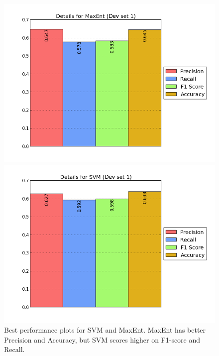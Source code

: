 \begin{figure}[!htb]
	\centering
	\begin{minipage}{.45\linewidth}
		\includegraphics[width=\linewidth]{../img/plots/analysis/maxent_stats_best.png}
	\end{minipage}
	\hspace{0.05\linewidth}
	\begin{minipage}{.45\linewidth}
		\includegraphics[width=\linewidth]{../img/plots/analysis/svm_stats_best.png}
	\end{minipage}
	\caption[Best performance plots for SVM and MaxEnt]{Best performance plots for SVM and MaxEnt. MaxEnt has better Precision and Accuracy, but SVM scores higher on F1-score and Recall.}
	\label{fig:best_result}
\end{figure}

